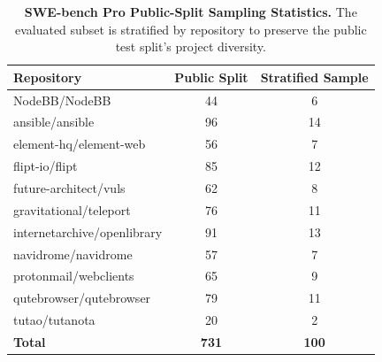 \begin{table}[t]
\centering
\small
\caption{\textbf{SWE-bench Pro Public-Split Sampling Statistics.} The evaluated subset is stratified by repository to preserve the public test split's project diversity.}
\label{tab:swebench_dataset_stats}
\vspace{0.15cm}
\begin{tabular}{lcc}
\toprule
\textbf{Repository} & \textbf{Public Split} & \textbf{Stratified Sample} \\
\midrule
NodeBB/NodeBB & 44 & 6 \\
ansible/ansible & 96 & 14 \\
element-hq/element-web & 56 & 7 \\
flipt-io/flipt & 85 & 12 \\
future-architect/vuls & 62 & 8 \\
gravitational/teleport & 76 & 11 \\
internetarchive/openlibrary & 91 & 13 \\
navidrome/navidrome & 57 & 7 \\
protonmail/webclients & 65 & 9 \\
qutebrowser/qutebrowser & 79 & 11 \\
tutao/tutanota & 20 & 2 \\
\midrule
\textbf{Total} & \textbf{731} & \textbf{100} \\
\bottomrule
\end{tabular}
\end{table}
